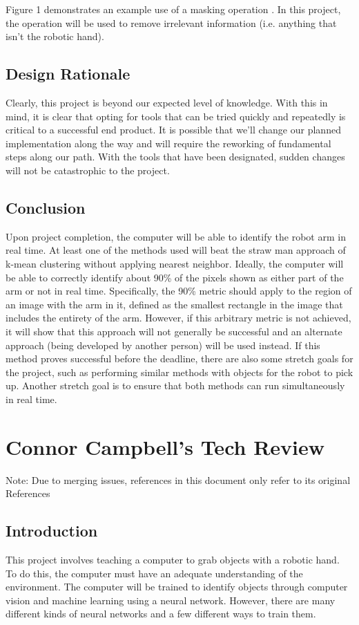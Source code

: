 \documentclass[10pt,journal,compsoc, draftclsnofoot,onecolumn]{IEEEtran}
\begin{document}
\noindent
Figure 1 demonstrates an example use of a masking operation \cite{2:online}.
In this project, the operation will be used to remove irrelevant information (i.e. anything that isn't the robotic hand). 

\subsection{Design Rationale}
Clearly, this project is beyond our expected level of knowledge.
With this in mind, it is clear that opting for tools that can be tried quickly and repeatedly is critical to a successful end product.
It is possible that we'll change our planned implementation along the way and will require the reworking of fundamental steps along our path.
With the tools that have been designated, sudden changes will not be catastrophic to the project.

\subsection{Conclusion}
Upon project completion, the computer will be able to identify the robot arm in real time.
At least one of the methods used will beat the straw man approach of k-mean clustering without applying nearest neighbor.
Ideally, the computer will be able to correctly identify about 90\% of the pixels shown as either part of the arm or not in real time.
Specifically, the 90\% metric should apply to the region of an image with the arm in it, defined as the smallest rectangle in the image that includes the entirety of the arm.
However, if this arbitrary metric is not achieved, it will show that this approach will not generally be successful and an alternate approach (being developed by another person) will be used instead.
If this method proves successful before the deadline, there are also some stretch goals for the project, such as performing similar methods with objects for the robot to pick up.
Another stretch goal is to ensure that both methods can run simultaneously in real time.


\newpage
\section{Connor Campbell's Tech Review}
Note: Due to merging issues, references in this document only refer to its original References

\subsection{Introduction}
This project involves teaching a computer to grab objects with a robotic hand. To do this, the computer must
have an adequate understanding of the environment. The computer will be trained to identify objects through
computer vision and machine learning using a neural network. However, there are many different kinds of
neural networks and a few different ways to train them.
\end{document}
